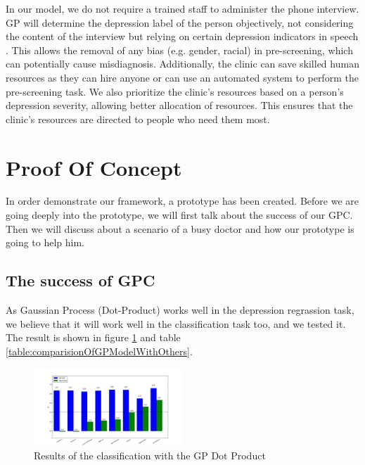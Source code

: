 \documentclass{article}
\begin{document}
    In our model, we do not require a trained staff to administer the phone interview. 
    GP will determine the depression label of the person objectively, not considering the content of the interview but relying on certain depression indicators in speech \cite{nimh2015}. 
    This allows the removal of any bias (e.g. gender, racial) in pre-screening, which can potentially cause misdiagnosis. 
    Additionally, the clinic can save skilled human resources as they can hire anyone or can use an automated system to perform the pre-screening task.
    We also prioritize the clinic's resources based on a person's depression severity, allowing better allocation of resources. 
    This ensures that the clinic's resources are directed to people who need them most. 	

	\section{Proof Of Concept}
	In order demonstrate our framework, a prototype has been created. Before we are going deeply into the prototype, we will first talk about the success of our GPC. 
	Then we will discuss about a scenario of a busy doctor and how our prototype is going to help him.
	
	\subsection{The success of GPC}
	As Gaussian Process (Dot-Product) works well in the depression regrassion task, we believe that it will work well in the classification task too, and we tested it. 
	The result is shown in figure \ref{figure:gp_dot_product} and table \ref{table:comparisionOfGPModelWithOthers}.
	
         \begin{figure}[h]
 		    \begin{center}
		    \includegraphics[width=0.5\textwidth]{gp_dot_product}
  		    \end{center}
  		    \caption{Results of the classification with the GP Dot Product}
  		    \label{figure:gp_dot_product}
 	 \end{figure}
\end{document}
